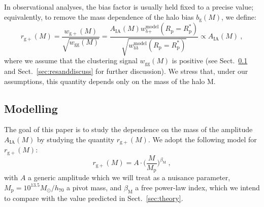\documentclass[a4paper,11pt]{article}
\begin{document}
In observational analyses, the bias factor is usually held fixed to a precise value; equivalently, to remove the mass dependence of the halo bias $b_{\mathrm{g}} (M)$, we define:
\begin{equation}
    r_{\mathrm{g+}} (M)=\frac{w_{\mathrm{g+}} (M)}{\sqrt{w_{\mathrm{gg}} (M)}} =\frac{A_{\mathrm{IA}} (M) w_{\mathrm{\delta} \mathrm{+}}^{\mathrm{model}} (R_{\mathrm{p}} = R_{\mathrm{p}}^*) }{\sqrt{w_{\mathrm{\delta} \mathrm{\delta}}^{\mathrm{model}} (R_{\mathrm{p}}=R_{\mathrm{p}}^*)}} \propto A_{\mathrm{IA}} (M) \ ,
	\label{eq:rg+}
\end{equation}
where we assume that the clustering signal $w_{\mathrm{gg}}(M)$ is positive (see Sect.~\ref{subsec:modelling} and Sect.~\ref{sec:resanddiscuss} for further discussion). We stress that, under our assumptions, this quantity depends only on the mass of the halo M.

\subsection{Modelling}
\label{subsec:modelling}
The goal of this paper is to study the dependence on the mass of the amplitude $A_{\mathrm{IA}} (M)$ by studying the quantity $r_{\mathrm{g+}} (M)$.
We adopt the following model for $r_{\mathrm{g+}} (M)$:
\begin{equation}
    r_{\mathrm{g+}} (M) = A \cdot  \biggl ( \frac{M}{M_{\mathrm{p}}} \biggl )^{\beta_{\mathrm{M}}} \ ,
	\label{eq:modelrg+}
\end{equation}
with $A$ a generic amplitude which we will treat as a nuisance parameter, $M_{\mathrm{p}} = 10^{13.5} M_{\odot}/h_{70}$ a pivot mass, and $\beta_{\mathrm{M}}$ a free power-law index, which we intend to compare with the value predicted in Sect.~\ref{sec:theory}.
\end{document}
